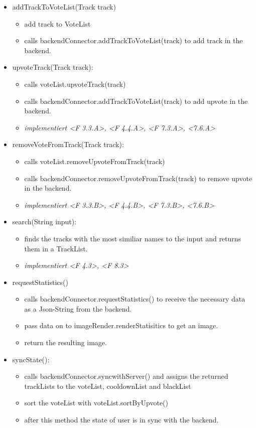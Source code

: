 \documentclass[oneside, ngerman]{sdqtechreport}
\begin{document}
\begin{itemize}
    \item addTrackToVoteList(Track track)
    \begin{itemize}
        \item add track to VoteList
        \item calls backendConnector.addTrackToVoteList(track) to add track in the backend.
    \end{itemize}
    \item upvoteTrack(Track track):
    \begin{itemize}
        \item calls voteList.upvoteTrack(track)
        \item calls backendConnector.addTrackToVoteList(track) to add upvote in the backend.
        \item \textit{implementiert <F 3.3.A>, <F 4.4.A>, <F 7.3.A>, <7.6.A>}
    \end{itemize}
    \item removeVoteFromTrack(Track track):
        \begin{itemize}
            \item calls voteList.removeUpvoteFromTrack(track)
            \item calls backendConnector.removeUpvoteFromTrack(track) to remove upvote in the backend.
            \item \textit{implementiert <F 3.3.B>, <F 4.4.B>, <F 7.3.B>, <7.6.B>}
        \end{itemize}
    \item search(String input):
    \begin{itemize}
        \item finds the tracks with the most similiar names to the input and returns them in a TrackList.
        \item \textit{implementiert <F 4.3>, <F 8.3>}
    \end{itemize}
    \item requestStatistics()
    \begin{itemize}
      \item calls backendConnector.requestStatistics() to receive the necessary data as a Json-String from the backend.
      \item pass data on to imageRender.renderStatisitics to get an image.
      \item return the resulting image.
    \end{itemize}
    \item syncState():
    \begin{itemize}
        \item calls backendConnector.syncwithServer() and assigns the returned trackLists to the voteList, cooldownList and blackList
        \item sort the voteList with voteList.sortByUpvote()
        \item after this method the state of user is in sync with the backend.
    \end{itemize}
    
\end{itemize}
\end{document}
